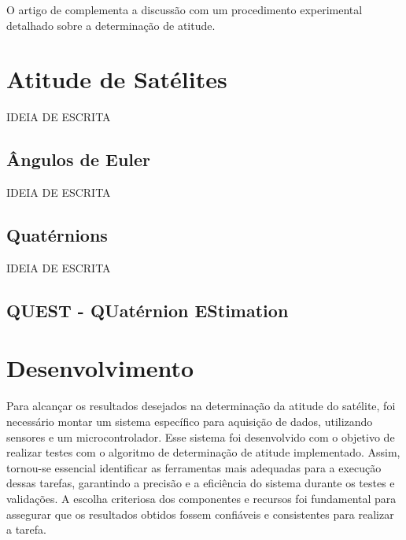 \documentclass[
	12pt,				%
	openright,			%
	oneside,			%
	a4paper,			%
	english,			%
	brazil				%
	]{abntex2}
\begin{document}
 O artigo de \cite{ferreira2008} complementa a discussão com um procedimento experimental detalhado sobre a determinação de atitude.


 

\chapter{Atitude de Satélites}\label{cap:atitude}

IDEIA DE ESCRITA

\section{Ângulos de Euler}


IDEIA DE ESCRITA



\section{Quatérnions}

IDEIA DE ESCRITA

\section{QUEST - QUatérnion EStimation}


\chapter{Desenvolvimento} \label{cap:desenvolvimento}

Para alcançar os resultados desejados na determinação da atitude do satélite, foi necessário montar um sistema específico para aquisição de dados, utilizando sensores e um microcontrolador. Esse sistema foi desenvolvido com o objetivo de realizar testes com o algoritmo de determinação de atitude implementado. Assim, tornou-se essencial identificar as ferramentas mais adequadas para a execução dessas tarefas, garantindo a precisão e a eficiência do sistema durante os testes e validações. A escolha criteriosa dos componentes e recursos foi fundamental para assegurar que os resultados obtidos fossem confiáveis e consistentes para realizar a tarefa.
\end{document}
